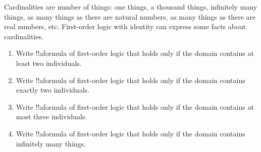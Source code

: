 \documentclass[../../../../include/open-logic-section]{subfiles}
\begin{document}


\begin{prob}
Cardinalities are number of things: one things, a thousand things, infinitely many things, as many things as there are natural numbers, as many things as there are real numbers, etc. First-order logic with identity can express some facts 
about cardinalities. 
\begin{enumerate}
	\item Write !!a{formula} of first-order logic that holds only if the domain contains at least two individuals.
	\item Write !!a{formula} of first-order logic that holds only if the domain contains exactly two individuals.
	\item Write !!a{formula} of first-order logic that holds only if the domain contains at most three individuals.
	\item Write !!a{formula} of first-order logic that holds only if the domain contains infinitely many things.
\end{enumerate}
\begin{ans}
\end{ans}
\end{prob}
\end{document}
